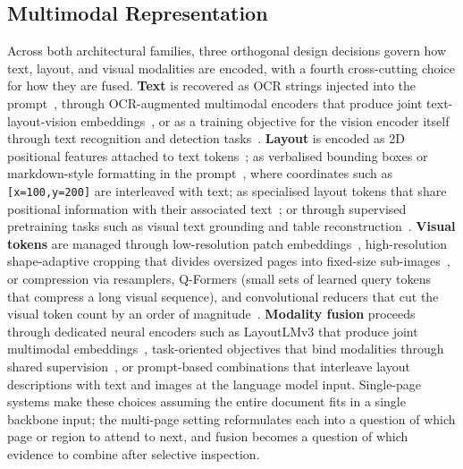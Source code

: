 \documentclass[11pt]{article}
\begin{document}
\subsection{Multimodal Representation}
\label{sec:bg-modality}

Across both architectural families, three orthogonal design decisions govern how text, layout, and visual modalities are encoded, with a fourth cross-cutting choice for how they are fused. \textbf{Text} is recovered as OCR strings injected into the prompt~\cite{wang2024docllm}, through OCR-augmented multimodal encoders that produce joint text-layout-vision embeddings~\cite{luo2024layoutllm,zhu2025enhancing}, or as a training objective for the vision encoder itself through text recognition and detection tasks~\cite{wang2025marten}. \textbf{Layout} is encoded as 2D positional features attached to text tokens~\cite{xu2020layoutlm,zhu2025enhancing}; as verbalised bounding boxes or markdown-style formatting in the prompt~\cite{perot2024lmdx}, where coordinates such as \texttt{[x=100,y=200]} are interleaved with text; as specialised layout tokens that share positional information with their associated text~\cite{zhu2025laytokenllm}; or through supervised pretraining tasks such as visual text grounding and table reconstruction~\cite{liu2024textmonkey}. \textbf{Visual tokens} are managed through low-resolution patch embeddings~\cite{tanaka2024instructdoc}, high-resolution shape-adaptive cropping that divides oversized pages into fixed-size sub-images~\cite{ye2023ureader,hu2024mplugdocowl}, or compression via resamplers, Q-Formers (small sets of learned query tokens that compress a long visual sequence), and convolutional reducers that cut the visual token count by an order of magnitude~\cite{hu2025mplugdocowl2,yu2024texthawk2,liu2024textmonkey}. \textbf{Modality fusion} proceeds through dedicated neural encoders such as LayoutLMv3 that produce joint multimodal embeddings~\cite{huang2022layoutlmv3,luo2024layoutllm}, task-oriented objectives that bind modalities through shared supervision~\cite{hu2024mplugdocowl,wang2025marten}, or prompt-based combinations that interleave layout descriptions with text and images at the language model input. Single-page systems make these choices assuming the entire document fits in a single backbone input; the multi-page setting reformulates each into a question of which page or region to attend to next, and fusion becomes a question of which evidence to combine after selective inspection.


\end{document}
